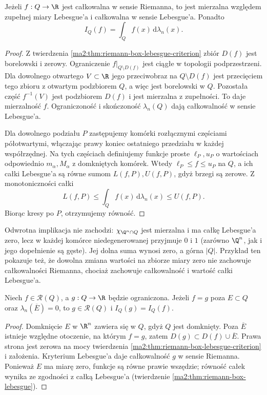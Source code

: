 \begin{twierdzenie}
\label{ma2:thm:riemann-box-lebesgue}
Jeżeli $f:Q\to\R$ jest całkowalna w sensie Riemanna,
to jest mierzalna względem zupełnej miary Lebesgue'a
i całkowalna w sensie Lebesgue'a. Ponadto
\[
 I_Q(f)=\int_Q f(x)\,\mathrm d\lambda_n(x).
\]
\end{twierdzenie}
\begin{proof}
Z twierdzenia \ref{ma2:thm:riemann-box-lebesgue-criterion}
zbiór $D(f)$ jest borelowski i zerowy.
Ograniczenie $f|_{Q\setminus D(f)}$ jest ciągłe
w topologii podprzestrzeni. Dla dowolnego otwartego
$V\subset\R$ jego przeciwobraz na $Q\setminus D(f)$
jest przecięciem tego zbioru z otwartym podzbiorem $Q$,
a więc jest borelowski w $Q$. Pozostała część
$f^{-1}(V)$ jest podzbiorem $D(f)$ i jest mierzalna
z zupełności. To daje mierzalność $f$.
Ograniczoność i skończoność $\lambda_n(Q)$ dają
całkowalność w sensie Lebesgue'a.

Dla dowolnego podziału $P$ zastępujemy komórki
rozłącznymi częściami półotwartymi, włączając
prawy koniec ostatniego przedziału w każdej
współrzędnej. Na tych częściach definiujemy
funkcje proste $\ell_P,u_P$ o wartościach
odpowiednio $m_\alpha,M_\alpha$ z domkniętych
komórek. Wtedy $\ell_P\le f\le u_P$ na $Q$,
a ich całki Lebesgue'a są równe sumom
$L(f,P),U(f,P)$, gdyż brzegi są zerowe.
Z monotoniczności całki
\[
 L(f,P)\le\int_Q f(x)\,\mathrm d\lambda_n(x)\le U(f,P).
\]
Biorąc kresy po $P$, otrzymujemy równość.
\end{proof}

Odwrotna implikacja nie zachodzi:
$\chi_{\Q^n\cap Q}$ jest mierzalna i ma całkę
Lebesgue'a zero, lecz w każdej komórce
niedegenerowanej przyjmuje $0$ i $1$ (zarówno
$\Q^n$, jak i jego dopełnienie są gęste).
Jej dolna suma wynosi zero, a górna $|Q|$.
Przykład ten pokazuje też, że dowolna zmiana
wartości na zbiorze miary zero nie zachowuje
całkowalności Riemanna, chociaż zachowuje
całkowalność i wartość całki Lebesgue'a.

\begin{wniosek}
\label{ma2:cor:riemann-box-null-change}
Niech $f\in\mathcal R(Q)$, a $g:Q\to\R$
będzie ograniczona. Jeżeli $f=g$ poza
$E\subset Q$ oraz $\lambda_n(\overline E)=0$,
to $g\in\mathcal R(Q)$ i $I_Q(g)=I_Q(f)$.
\end{wniosek}
\begin{proof}
Domknięcie $E$ w $\R^n$ zawiera się w $Q$,
gdyż $Q$ jest domknięty. Poza $\overline E$
istnieje względne otoczenie, na którym $f=g$,
zatem $D(g)\subset D(f)\cup\overline E$.
Prawa strona jest zerowa na mocy
twierdzenia \ref{ma2:thm:riemann-box-lebesgue-criterion}
i założenia. Kryterium Lebesgue'a daje
całkowalność $g$ w sensie Riemanna.
Ponieważ $E$ ma miarę zero, funkcje są
równe prawie wszędzie; równość całek
wynika ze zgodności z całką Lebesgue'a
(twierdzenie \ref{ma2:thm:riemann-box-lebesgue}).
\end{proof}

